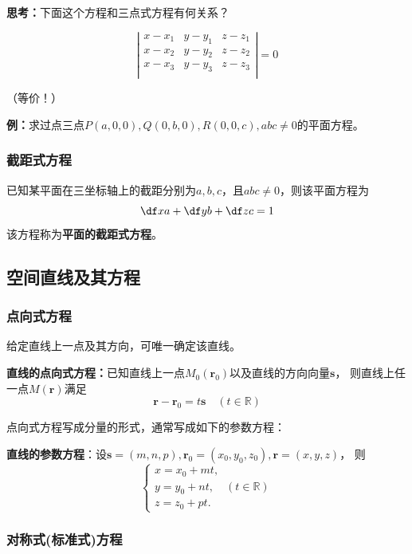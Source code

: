 {\bf 思考：}下面这个方程和三点式方程有何关系？

$$\left|\begin{array}{ccc}
x-x_1 & y-y_1 & z-z_1\\
x-x_2 & y-y_2 & z-z_2\\
x-x_3 & y-y_3 & z-z_3\\
\end{array}\right|
=0
$$

\hfill （等价！）

{\bf 例：}求过点三点$P(a,0,0),Q(0,b,0),R(0,0,c),abc\ne0$的平面方程。

\subsubsection{截距式方程}

\begin{thx}
	已知某平面在三坐标轴上的截距分别为$a,b,c$，且$abc\ne 0$，则该平面方程为
	$$\df xa+\df yb+\df zc=1$$
	该方程称为{\bf 平面的截距式方程}。
\end{thx}


\subsection{空间直线及其方程}

\subsubsection{点向式方程}

给定直线上一点及其方向，可唯一确定该直线。

\begin{thx}
	{\bf 直线的点向式方程：}已知直线上一点$M_0(\bm{r}_0)$以及直线的方向向量$\bm{s}$，
	则直线上任一点$M(\bm{r})$满足 
	$${\bm{r}-\bm{r}_0=t\bm{s}\quad(t\in\mathbb{R})}$$ 
\end{thx}

点向式方程写成分量的形式，通常写成如下的参数方程：

\begin{thx}
	{\bf 直线的参数方程}：设$\bm{s}=(m,n,p),\bm{r}_0=(x_0,y_0,z_0),
	\bm{r}=(x,y,z)$， 则
	$$
		{\left\{\begin{array}{l}
			x=x_0+mt,\\
			y=y_0+nt,\quad (t\in\mathbb{R})\\
			z=z_0+pt.
		\end{array}\right.}
	$$
\end{thx}

\subsubsection{对称式(标准式)方程}

